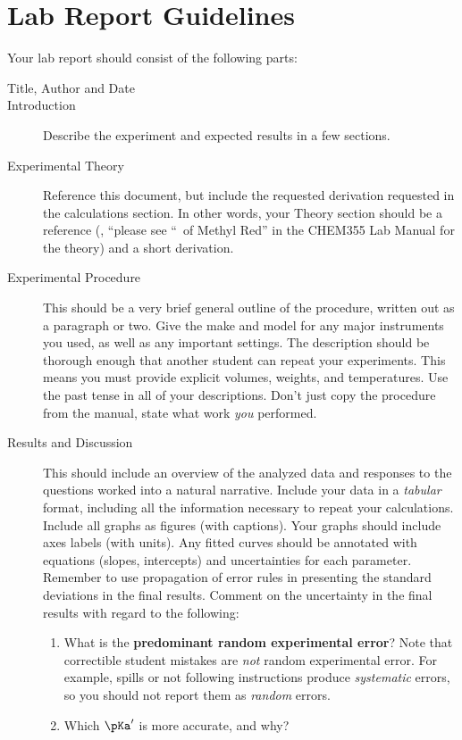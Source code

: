 \section{Lab Report Guidelines} %
\label{sec:lab_report_guidelines}

Your lab report should consist of the following parts:
\begin{description}
	\item[Title, Author and Date]
	\item[Introduction] Describe the experiment and expected results in a few sections. 
	\item[Experimental Theory] Reference this document, but include the requested derivation requested in the calculations section. In other words, your Theory section should be a reference (\eg, ``please see ``\pKa\ of Methyl Red'' in the CHEM355 Lab Manual for the theory) and a short derivation.
	\item[Experimental Procedure] This should be a very brief general outline of the procedure, written out as a paragraph or two. Give the make and model for any major instruments you used, as well as any important settings. The description should be thorough enough that another student can repeat your experiments. This means you must provide explicit volumes, weights, and temperatures. Use the past tense in all of your descriptions. Don't just copy the procedure from the manual, state what work \emph{you} performed. 
	\item[Results and Discussion] This should include an overview of the analyzed data and responses to the questions worked into a natural narrative. 
	Include your data in a \emph{tabular} format, including all the information necessary to repeat your calculations. 
	Include all graphs as figures (with captions). 
	Your graphs should include axes labels (with units). 
	Any fitted curves should be annotated with equations (slopes, intercepts) and uncertainties for each parameter. 
	Remember to use propagation of error rules in presenting the standard deviations in the final results. 
	Comment on the uncertainty in the final results with regard to the following:
	\begin{enumerate}
		\item What is the \textbf{predominant random experimental error}? Note that correctible student mistakes are \emph{not} random experimental error. For example, spills or not following instructions produce \emph{systematic} errors, so you should not report them as \emph{random} errors. 
		\item Which \(\pKa'\) is more accurate, and why?

\end{enumerate}
\end{description}

